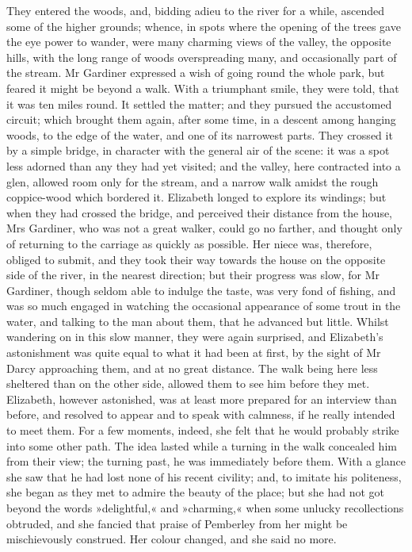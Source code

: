 They entered the woods, and, bidding adieu to the river for a while, ascended some of the higher grounds; whence, in spots where the opening of the trees gave the eye power to wander, were many charming views of the valley, the opposite hills, with the long range of woods overspreading many, and occasionally part of the stream. Mr Gardiner expressed a wish of going round the whole park, but feared it might be beyond a walk. With a triumphant smile, they were told, that it was ten miles round. It settled the matter; and they pursued the accustomed circuit; which brought them again, after some time, in a descent among hanging woods, to the edge of the water, and one of its narrowest parts. They crossed it by a simple bridge, in character with the general air of the scene: it was a spot less adorned than any they had yet visited; and the valley, here contracted into a glen, allowed room only for the stream, and a narrow walk amidst the rough coppice-wood which bordered it. Elizabeth longed to explore its windings; but when they had crossed the bridge, and perceived their distance from the house, Mrs Gardiner, who was not a great walker, could go no farther, and thought only of returning to the carriage as quickly as possible. Her niece was, therefore, obliged to submit, and they took their way towards the house on the opposite side of the river, in the nearest direction; but their progress was slow, for Mr Gardiner, though seldom able to indulge the taste, was very fond of fishing, and was so much engaged in watching the occasional appearance of some trout in the water, and talking to the man about them, that he advanced but little. Whilst wandering on in this slow manner, they were again surprised, and Elizabeth's astonishment was quite equal to what it had been at first, by the sight of Mr Darcy approaching them, and at no great distance. The walk being here less sheltered than on the other side, allowed them to see him before they met. Elizabeth, however astonished, was at least more prepared for an interview than before, and resolved to appear and to speak with calmness, if he really intended to meet them. For a few moments, indeed, she felt that he would probably strike into some other path. The idea lasted while a turning in the walk concealed him from their view; the turning past, he was immediately before them. With a glance she saw that he had lost none of his recent civility; and, to imitate his politeness, she began as they met to admire the beauty of the place; but she had not got beyond the words »delightful,« and »charming,« when some unlucky recollections obtruded, and she fancied that praise of Pemberley from her might be mischievously construed. Her colour changed, and she said no more.

